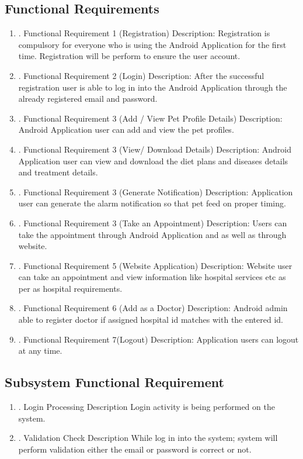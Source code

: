 \subsection{Functional Requirements}
\begin{enumerate}[label=\alph*]
\item. Functional Requirement 1 (Registration)
Description:
Registration is compulsory for everyone who is using the Android Application for the first time. Registration will be perform to ensure the user account.
\item. Functional Requirement 2 (Login)
Description:
After the successful registration user is able to log in into the Android Application through the already registered email and password.
\item. Functional Requirement 3 (Add / View Pet Profile Details)
Description:
Android Application user can add and view the pet profiles. 
\item. Functional Requirement 3 (View/ Download Details)
Description:
Android Application user can view and download the diet plans and diseases details and treatment details. 
\item. Functional Requirement 3 (Generate Notification)
Description:
Application user can generate the alarm notification so that pet feed on proper timing.	
\item. Functional Requirement 3 (Take an Appointment)
Description:
Users can take the appointment through Android Application and as well as through website.
\item. Functional Requirement 5 (Website Application)
Description: 
Website user can take an appointment and view information like hospital services etc as per as hospital requirements.
\item. Functional Requirement 6 (Add as a Doctor)
Description: 
Android admin able to register doctor if assigned hospital id matches with the entered id.
\item. Functional Requirement 7(Logout)
Description:
Application users can logout at any time.
\end{enumerate}

\subsection{ Subsystem Functional Requirement}
\begin{enumerate}[label=\alph*]
\item. Login Processing
Description
Login activity is being performed on the system.
\item. Validation Check
Description
While log in into the system; system will perform validation either the email or password is correct or not.
\end{enumerate}

